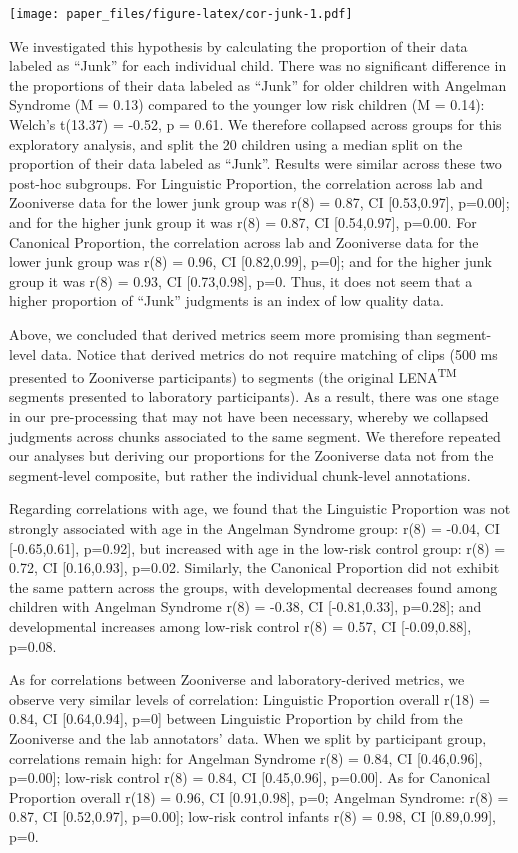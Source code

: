 \documentclass[english,,man,floatsintext]{apa6}
\begin{document}
\texttt{[image: paper\_files/figure-latex/cor-junk-1.pdf]}

We investigated this hypothesis by calculating the proportion of their data labeled as \enquote{Junk} for each individual child. There was no significant difference in the proportions of their data labeled as \enquote{Junk} for older children with Angelman Syndrome (M = 0.13) compared to the younger low risk children (M = 0.14): Welch's t(13.37) = -0.52, p = 0.61. We therefore collapsed across groups for this exploratory analysis, and split the 20 children using a median split on the proportion of their data labeled as \enquote{Junk}. Results were similar across these two post-hoc subgroups. For Linguistic Proportion, the correlation across lab and Zooniverse data for the lower junk group was r(8) = 0.87, CI {[}0.53,0.97{]}, p=0.00{]}; and for the higher junk group it was r(8) = 0.87, CI {[}0.54,0.97{]}, p=0.00. For Canonical Proportion, the correlation across lab and Zooniverse data for the lower junk group was r(8) = 0.96, CI {[}0.82,0.99{]}, p=0{]}; and for the higher junk group it was r(8) = 0.93, CI {[}0.73,0.98{]}, p=0. Thus, it does not seem that a higher proportion of \enquote{Junk} judgments is an index of low quality data.

Above, we concluded that derived metrics seem more promising than segment-level data. Notice that derived metrics do not require matching of clips (500 ms presented to Zooniverse participants) to segments (the original LENA\textsuperscript{TM} segments presented to laboratory participants). As a result, there was one stage in our pre-processing that may not have been necessary, whereby we collapsed judgments across chunks associated to the same segment. We therefore repeated our analyses but deriving our proportions for the Zooniverse data not from the segment-level composite, but rather the individual chunk-level annotations.

Regarding correlations with age, we found that the Linguistic Proportion was not strongly associated with age in the Angelman Syndrome group: r(8) = -0.04, CI {[}-0.65,0.61{]}, p=0.92{]}, but increased with age in the low-risk control group: r(8) = 0.72, CI {[}0.16,0.93{]}, p=0.02. Similarly, the Canonical Proportion did not exhibit the same pattern across the groups, with developmental decreases found among children with Angelman Syndrome r(8) = -0.38, CI {[}-0.81,0.33{]}, p=0.28{]}; and developmental increases among low-risk control r(8) = 0.57, CI {[}-0.09,0.88{]}, p=0.08.

As for correlations between Zooniverse and laboratory-derived metrics, we observe very similar levels of correlation: Linguistic Proportion overall r(18) = 0.84, CI {[}0.64,0.94{]}, p=0{]} between Linguistic Proportion by child from the Zooniverse and the lab annotators' data. When we split by participant group, correlations remain high: for Angelman Syndrome r(8) = 0.84, CI {[}0.46,0.96{]}, p=0.00{]}; low-risk control r(8) = 0.84, CI {[}0.45,0.96{]}, p=0.00{]}. As for Canonical Proportion overall r(18) = 0.96, CI {[}0.91,0.98{]}, p=0; Angelman Syndrome: r(8) = 0.87, CI {[}0.52,0.97{]}, p=0.00{]}; low-risk control infants r(8) = 0.98, CI {[}0.89,0.99{]}, p=0.
\end{document}
